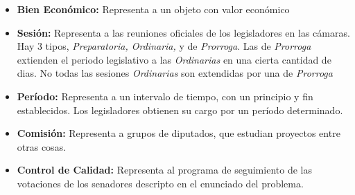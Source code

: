 \begin{itemize}
\quad

\item \textbf{Bien Econ\'omico: } Representa a un objeto con valor econ\'omico

\quad

\item \textbf{Sesi\'on: } Representa a las reuniones oficiales de los legisladores en las c\'amaras. Hay 3 tipos, \textit{Preparatoria, Ordinaria,} y de \textit{Prorroga}. Las de \textit{Prorroga} extienden el periodo legislativo a las \textit{Ordinarias} en una cierta cantidad de dias. No todas las sesiones \textit{Ordinarias} son extendidas por una de \textit{Prorroga}

\quad

\item \textbf{Per\'iodo: } Representa a un intervalo de tiempo, con un principio y fin establecidos. Los legisladores obtienen su cargo por un per\'iodo determinado.

\quad

\item \textbf{Comisi\'on: } Representa a grupos de diputados, que estudian proyectos entre otras cosas.

\quad

\item \textbf{Control de Calidad: } Representa al programa de seguimiento de las votaciones de los senadores descripto en el enunciado del problema.


\end{itemize}